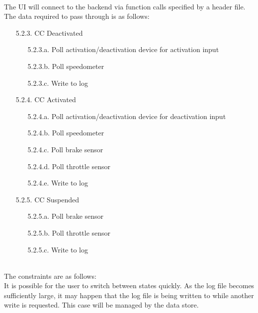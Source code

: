 \documentclass{article}
\begin{document}
	\ \\ \indent The UI will connect to the backend via function calls specified by a header file. The data required to pass through is as follows:
	\begin{enumerate}
		\item[5.2.3.] CC Deactivated
		\begin{enumerate}
			\item[5.2.3.a.] Poll activation/deactivation device for activation input
			\item[5.2.3.b.] Poll speedometer
			\item[5.2.3.c.] Write to log
		\end{enumerate}
		\item[5.2.4.] CC Activated
		\begin{enumerate}
			\item[5.2.4.a.] Poll activation/deactivation device for deactivation input
			\item[5.2.4.b.] Poll speedometer
			\item[5.2.4.c.] Poll brake sensor
			\item[5.2.4.d.] Poll throttle sensor
			\item[5.2.4.e.] Write to log
		\end{enumerate}
		\item[5.2.5.] CC Suspended
		\begin{enumerate}
			\item[5.2.5.a.] Poll brake sensor
			\item[5.2.5.b.] Poll throttle sensor
			\item[5.2.5.c.] Write to log
		\end{enumerate}
	\end{enumerate}
	
	\ \\ \indent The constraints are as follows: \\
	\indent It is possible for the user to switch between states quickly. As the log file becomes sufficiently large, it may happen that the log file is being written to while another write is requested. This case will be managed by the data store.
	
\end{document}

